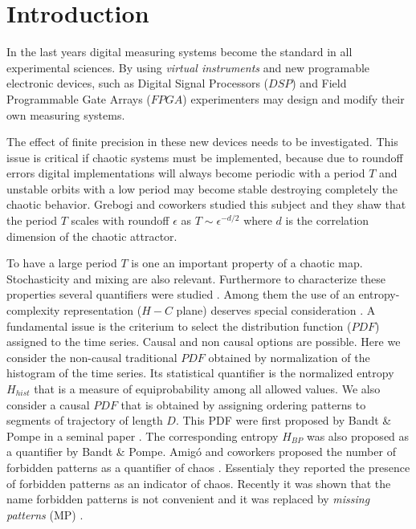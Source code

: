 \section{Introduction} \label{sec:intro}
In the last years digital measuring systems become the standard in all experimental sciences. By using \textit{virtual instruments} and new programable electronic
devices, such as Digital Signal Processors ($DSP$) and Field
Programmable Gate Arrays ($FPGA$)  experimenters may design and
modify their own measuring systems.

The effect of finite precision in these new devices needs to be
investigated. This issue is critical if  chaotic systems must be implemented, because due to roundoff errors digital implementations will always become periodic with a period $T$ and unstable orbits with a low period may become stable destroying completely the chaotic behavior.  
Grebogi and coworkers \cite{Grebogi1988} studied this subject and they shaw that the period $T$ scales with roundoff $\epsilon$ as
$T\sim\epsilon^{-d/2}$ where $d$ is the correlation dimension of
the chaotic attractor. 

To have a large period $T$ is one an important property of a chaotic map. Stochasticity and mixing are also relevant. Furthermore to characterize these properties several quantifiers were
studied  \cite{DeMicco2009}. Among them the use of an
entropy-complexity representation ($H-C$ plane) deserves special
consideration \cite{Rosso2007C,DeMicco2008,DeMicco2011,DeMicco2009,Rosso2009}. 
A fundamental issue is the criterium to select the distribution function ($PDF$) assigned to the time series. Causal and non causal options are possible. Here we consider the non-causal traditional $PDF$ obtained by normalization of the histogram of the time series. Its statistical quantifier is the normalized entropy$H_{hist}$ that is  a measure of equiprobability among all allowed values. We also consider a causal $PDF$  that is obtained by assigning ordering patterns to segments of trajectory of length $D$. This PDF were first proposed by Bandt \& Pompe in a seminal paper \cite{Pompe2002}. The corresponding entropy $H_{BP}$ was also proposed as a quantifier by Bandt \& Pompe. Amig\'o and coworkers proposed the number of forbidden patterns as a quantifier of chaos \cite{Amigo2007b}. Essentialy they reported the presence of forbidden patterns as an indicator of chaos. Recently it was shown that the name forbidden patterns is not convenient and it was replaced by  \textit{missing patterns }(MP) \cite{Rosso2012b}. 

